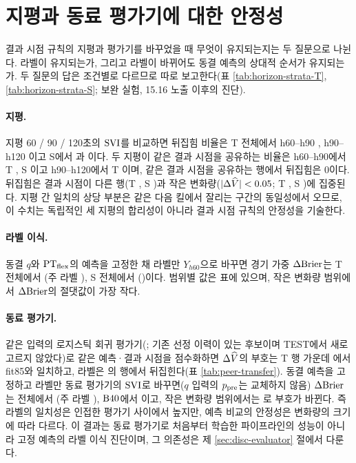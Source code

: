 \section{지평과 동료 평가기에 대한 안정성}
\label{sec:value-horizon}

결과 시점 규칙의 지평과 평가기를 바꾸었을 때 무엇이 유지되는지는 두 질문으로 나뉜다. 라벨이 유지되는가, 그리고 라벨이 바뀌어도 동결 예측의 상대적 순서가 유지되는가. 두 질문의 답은 조건별로 다르므로 따로 보고한다(표 \ref{tab:horizon-strata-T}, \ref{tab:horizon-strata-S}; 보완 실험, 15.16 노출 이후의 진단).

\paragraph{지평.} 지평 60 / 90 / 120초의 $\mathrm{SVI}$를 비교하면 뒤집힘 비율은 T 전체에서 h60--h90 \hzTAllFlipSixty{}, h90--h120 \hzTAllFlipHundredTwenty{}이고 S에서 \hzSAllFlipSixty{}과 \hzSAllFlipHundredTwenty{}이다. 두 지평이 같은 결과 시점을 공유하는 비율은 h60--h90에서 T \hzTAllSameEp{}, S \hzSAllSameEp{}이고 h90--h120에서 T \hzTSameEpNinety{}이며, 같은 결과 시점을 공유하는 행에서 뒤집힘은 0이다. 뒤집힘은 결과 시점이 다른 행(T \hzTAllFlipDiffEp{}, S \hzSAllFlipDiffEp{})과 작은 변화량($|\Delta\widehat V| < 0.05$; T \hzTSmallFlipSixty{}, S \hzSSmallFlipSixty{})에 집중된다. 지평 간 일치의 상당 부분은 같은 다음 킬에서 잘리는 구간의 동일성에서 오므로, 이 수치는 독립적인 세 지평의 합리성이 아니라 결과 시점 규칙의 안정성을 기술한다.

\paragraph{라벨 이식.} 동결 $q$와 $\mathrm{PT}_{\mathrm{flex}}$의 예측을 고정한 채 라벨만 $Y_{h60}$으로 바꾸면 경기 가중 $\Delta\mathrm{Brier}$는 T 전체에서 \hzTAllDbAlt{}(주 라벨 \hzTAllDbMain{}), S 전체에서 \hzSAllDbAlt{}(\hzSAllDbMain{})이다. 범위별 값은 표에 있으며, 작은 변화량 범위에서 $\Delta\mathrm{Brier}$의 절댓값이 가장 작다.




\paragraph{동료 평가기.} 같은 입력의 로지스틱 회귀 평가기(\texttt{\peerName{}}; 기존 선정 이력이 있는 후보이며 TEST에서 새로 고르지 않았다)로 같은 예측·결과 시점을 점수화하면 $\Delta\widehat V$의 부호는 T \peerN{} 행 가운데 \peerSignAgree{}에서 fit85와 일치하고, 라벨은 \peerFlipAll{}의 행에서 뒤집힌다(표 \ref{tab:peer-transfer}). 동결 예측을 고정하고 라벨만 동료 평가기의 $\mathrm{SVI}$로 바꾸면($q$ 입력의 $p_{\mathrm{pre}}$는 교체하지 않음) $\Delta\mathrm{Brier}$는 전체에서 \peerAllDbAlt{}(주 라벨 \peerAllDbMain{}), $\mathrm{B40}$에서 \peerBfortyDbAlt{}이고, 작은 변화량 범위에서는 \peerSmallDbAlt{}로 부호가 바뀐다. 즉 라벨의 일치성은 인접한 평가기 사이에서 높지만, 예측 비교의 안정성은 변화량의 크기에 따라 다르다. 이 결과는 동료 평가기로 처음부터 학습한 파이프라인의 성능이 아니라 고정 예측의 라벨 이식 진단이며, 그 의존성은 제 \ref{sec:disc-evaluator} 절에서 다룬다.


